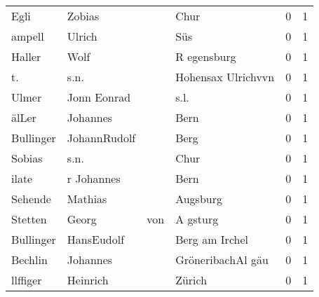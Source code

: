 \begin{tabular}{llllrr}
                     Egli &                             Zobias &             &                                        Chur &          0 &         1 \\
                   ampell &                             Ulrich &             &                                         Süs &          0 &         1 \\
                   Haller &                               Wolf &             &                                 R egensburg &          0 &         1 \\
                       t. &                               s.n. &             &                          Hohensax Ulrichvvn &          0 &         1 \\
                    Ulmer &                        Jonn Eonrad &             &                                        s.l. &          0 &         1 \\
                    älLer &                           Johannes &             &                                        Bern &          0 &         1 \\
                Bullinger &                       JohannRudolf &             &                                        Berg &          0 &         1 \\
                   Sobias &                               s.n. &             &                                        Chur &          0 &         1 \\
                    ilate &                         r Johannes &             &                                        Bern &          0 &         1 \\
                  Sehende &                            Mathias &             &                                    Augsburg &          0 &         1 \\
                  Stetten &                              Georg &         von &                                    A gsturg &          0 &         1 \\
                Bullinger &                         HansEudolf &             &                              Berg am Irchel &          0 &         1 \\
                  Bechlin &                           Johannes &             &                           GröneribachAl gäu &          0 &         1 \\
                 llffiger &                           Heinrich &             &                                      Zürich &          0 &         1 \\

\end{tabular}
